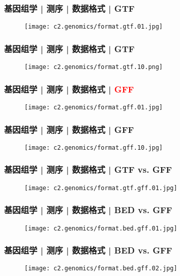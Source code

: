 \begin{frame}
  \frametitle{基因组学 | 测序 | 数据格式 | GTF}
  \begin{figure}
    \centering
    \texttt{[image: c2.genomics/format.gtf.01.jpg]}
  \end{figure}
\end{frame}
    
\begin{frame}
  \frametitle{基因组学 | 测序 | 数据格式 | GTF}
  \begin{figure}
    \centering
    \texttt{[image: c2.genomics/format.gtf.10.png]}
  \end{figure}
\end{frame}
    
\begin{frame}
  \frametitle{基因组学 | 测序 | 数据格式 | \textcolor{red}{GFF}}
  \begin{figure}
    \centering
    \texttt{[image: c2.genomics/format.gff.01.jpg]}
  \end{figure}
\end{frame}
    
\begin{frame}
  \frametitle{基因组学 | 测序 | 数据格式 | GFF}
  \begin{figure}
    \centering
    \texttt{[image: c2.genomics/format.gff.10.jpg]}
  \end{figure}
\end{frame}
    
\begin{frame}
  \frametitle{基因组学 | 测序 | 数据格式 | GTF vs. GFF}
  \begin{figure}
    \centering
    \texttt{[image: c2.genomics/format.gtf.gff.01.jpg]}
  \end{figure}
\end{frame}

\begin{frame}
  \frametitle{基因组学 | 测序 | 数据格式 | BED vs. GFF}
  \begin{figure}
    \centering
    \texttt{[image: c2.genomics/format.bed.gff.01.jpg]}
  \end{figure}
\end{frame}
    
\begin{frame}
  \frametitle{基因组学 | 测序 | 数据格式 | BED vs. GFF}
  \begin{figure}
    \centering
    \texttt{[image: c2.genomics/format.bed.gff.02.jpg]}
  \end{figure}
\end{frame}
    
